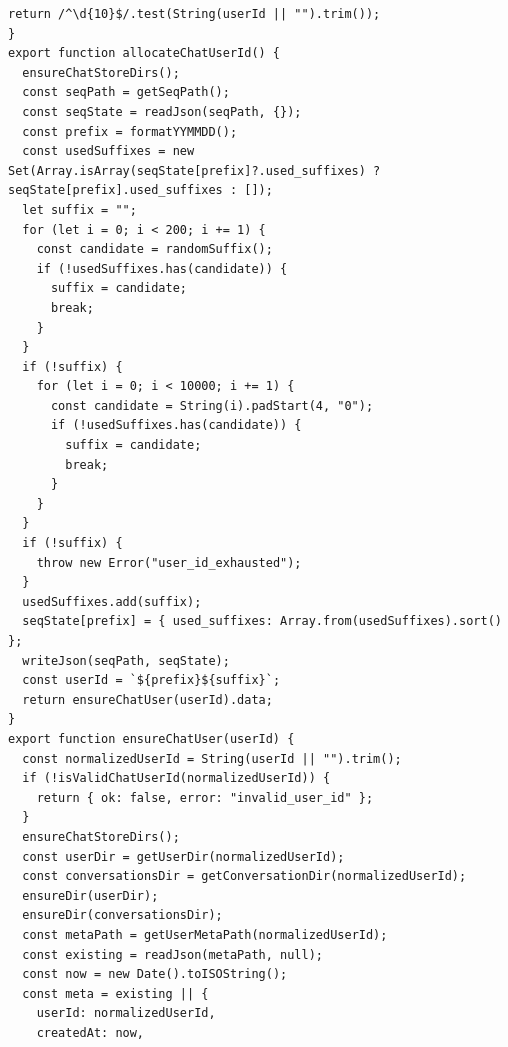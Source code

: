 \documentclass[12pt,a4paper]{article}
\begin{document}
\begin{Verbatim}[fontsize=\footnotesize]
  return /^\d{10}$/.test(String(userId || "").trim());
}
export function allocateChatUserId() {
  ensureChatStoreDirs();
  const seqPath = getSeqPath();
  const seqState = readJson(seqPath, {});
  const prefix = formatYYMMDD();
  const usedSuffixes = new Set(Array.isArray(seqState[prefix]?.used_suffixes) ? seqState[prefix].used_suffixes : []);
  let suffix = "";
  for (let i = 0; i < 200; i += 1) {
    const candidate = randomSuffix();
    if (!usedSuffixes.has(candidate)) {
      suffix = candidate;
      break;
    }
  }
  if (!suffix) {
    for (let i = 0; i < 10000; i += 1) {
      const candidate = String(i).padStart(4, "0");
      if (!usedSuffixes.has(candidate)) {
        suffix = candidate;
        break;
      }
    }
  }
  if (!suffix) {
    throw new Error("user_id_exhausted");
  }
  usedSuffixes.add(suffix);
  seqState[prefix] = { used_suffixes: Array.from(usedSuffixes).sort() };
  writeJson(seqPath, seqState);
  const userId = `${prefix}${suffix}`;
  return ensureChatUser(userId).data;
}
export function ensureChatUser(userId) {
  const normalizedUserId = String(userId || "").trim();
  if (!isValidChatUserId(normalizedUserId)) {
    return { ok: false, error: "invalid_user_id" };
  }
  ensureChatStoreDirs();
  const userDir = getUserDir(normalizedUserId);
  const conversationsDir = getConversationDir(normalizedUserId);
  ensureDir(userDir);
  ensureDir(conversationsDir);
  const metaPath = getUserMetaPath(normalizedUserId);
  const existing = readJson(metaPath, null);
  const now = new Date().toISOString();
  const meta = existing || {
    userId: normalizedUserId,
    createdAt: now,
\end{Verbatim}
\newpage
{}
\fancyhead[R]{}
\end{document}
